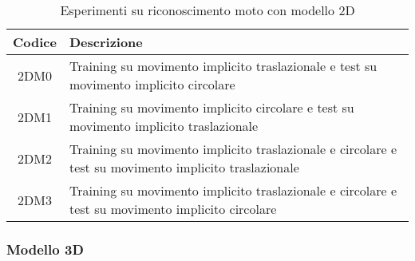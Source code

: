 \begin{table}[H]
	\begin{tabularx}{\textwidth}{|c|X|}
		\hline 
		\textbf{Codice} &
		\textbf{Descrizione} \\ 
		
		\hline 2DM0 &
		Training su movimento implicito traslazionale e test su movimento implicito circolare \\ 
		
		\hline 2DM1 &
		Training su movimento implicito circolare e test su movimento implicito traslazionale \\ 
		
		\hline 2DM2 & 
		Training su movimento implicito traslazionale e circolare e test su movimento implicito traslazionale \\ 
		
		\hline 2DM3 & 
		Training su movimento implicito traslazionale e circolare e test su movimento implicito circolare \\ 
		\hline 
	\end{tabularx}
	\caption{Esperimenti su riconoscimento moto con modello 2D}
	\label{esperimenti-riconoscimento-2D}
\end{table}

\newpage

\subsubsection{Modello 3D}

